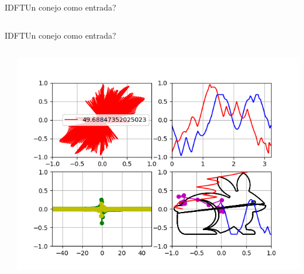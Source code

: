 \begin{frame}{IDFT}{Un conejo como entrada?}
   \handsonicon
   \begin{columns}[c]
      \hspace{2pt}
      \begin{column}{.5\textwidth}
         
      \end{column}
      \hspace{2pt}
      \vrule
      \hspace{2pt}
      \begin{column}{.5\textwidth}
         
      \end{column}
   \end{columns}
   \vfill
\end{frame}
\begin{frame}{IDFT}{Un conejo como entrada?}
   \handsonicon
   \begin{columns}[c]
      \hspace{2pt}
      \begin{column}{.5\textwidth}
         
      \end{column}
      \hspace{2pt}
      \vrule
      \hspace{2pt}
      \begin{column}{.4\textwidth}
         \centering\includegraphics[width=1.0\textwidth]{3_clase/euler8}
      \end{column}
      \hspace{2pt}
   \end{columns}
   \vfill
\end{frame}
